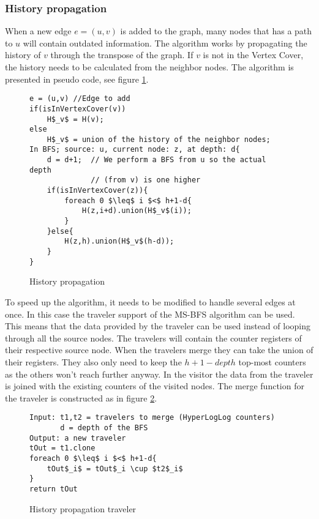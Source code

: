 \subsubsection{History propagation}

When a new edge $e = (u,v)$ is added to the graph, many nodes that has a path to $u$ will contain outdated information. The algorithm works by propagating the history of $v$ through the transpose of the graph. If $v$ is not in the Vertex Cover, the history needs to be calculated from the neighbor nodes. The algorithm is presented in pseudo code, see figure \ref{fig:history_propagation_algorithm}.

\begin{figure}[h]
    \begin{lstlisting}[mathescape]
e = (u,v) //Edge to add
if(isInVertexCover(v))
    H$_v$ = H(v);
else
    H$_v$ = union of the history of the neighbor nodes;
In BFS; source: u, current node: z, at depth: d{
    d = d+1;  // We perform a BFS from u so the actual depth 
              // (from v) is one higher
    if(isInVertexCover(z)){
        foreach 0 $\leq$ i $<$ h+1-d{
            H(z,i+d).union(H$_v$(i));
        }
    }else{
        H(z,h).union(H$_v$(h-d));
    }
}
    \end{lstlisting}
    \caption{History propagation}
    \label{fig:history_propagation_algorithm}
\end{figure}

To speed up the algorithm, it needs to be modified to handle several edges at once. In this case the traveler support of the MS-BFS algorithm can be used. This means that the data provided by the traveler can be used instead of looping through all the source nodes. The travelers will contain the counter registers of their respective source node. When the travelers merge they can take the union of their registers. They also only need to keep the $h+1-depth$ top-most counters as the others won't reach further anyway. In the visitor the data from the traveler is joined with the existing counters of the visited nodes. The merge function for the traveler is constructed as in figure \ref{fig:history_propagation_traveler}.

\begin{figure}[h]
    \begin{lstlisting}[mathescape]
Input: t1,t2 = travelers to merge (HyperLogLog counters)
       d = depth of the BFS
Output: a new traveler
tOut = t1.clone
foreach 0 $\leq$ i $<$ h+1-d{
    tOut$_i$ = tOut$_i \cup $t2$_i$
}
return tOut
    \end{lstlisting}
    \caption{History propagation traveler}
    \label{fig:history_propagation_traveler}
\end{figure}

